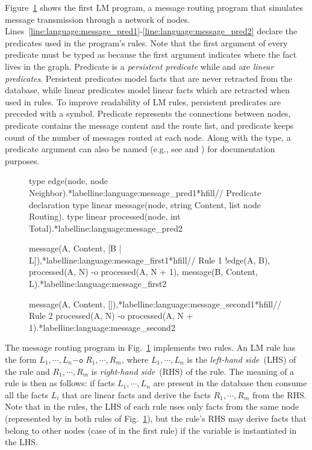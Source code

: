 
Figure~\ref{code:language:message} shows the first LM program, a message routing
program that simulates message transmission through a network of nodes.
Lines~\ref{line:language:message_pred1}-\ref{line:language:message_pred2}
declare the predicates used in the program's rules. Note that the first argument
of every predicate must be typed as  because the first argument
indicates where the fact lives in the graph. Predicate  is a
\emph{persistent predicate} while  and  are
\emph{linear predicates}. Persistent predicates model facts that are never
retracted from the database, while linear predicates model linear facts which
are retracted when used in rules. To improve readability of LM rules, persistent
predicates are preceded with a \code{!} symbol. Predicate  represents
the connections between nodes, predicate  contains the message
content and the route list, and predicate  keeps count of the
number of messages routed at each node. Along with the type, a predicate
argument can also be named (e.g., see  and ) for
documentation purposes.

\begin{figure}[h!]
\begin{LineCode}[commandchars=\*\{\}]
type edge(node, node Neighbor).*label{line:language:message_pred1}*hfill// Predicate declaration
type linear message(node, string Content, list node Routing).
type linear processed(node, int Total).*label{line:language:message_pred2}

message(A, Content, [B | L]),*label{line:language:message_first1}*hfill// Rule 1
!edge(A, B),
processed(A, N)
   -o processed(A, N + 1),
      message(B, Content, L).*label{line:language:message_first2}

message(A, Content, []),*label{line:language:message_second1}*hfill// Rule 2
processed(A, N)
   -o processed(A, N + 1).*label{line:language:message_second2}
\end{LineCode}
\label{code:language:message}
\end{figure}

The message routing program in Fig.~\ref{code:language:message} implements two
rules. An LM rule has the form $L_1, \cdots, L_n \mathtt{-o} \; R_1, \cdots,
R_m$, where $L_1, \cdots, L_n$ is the \emph{left-hand side}~(LHS) of the rule
and $R_1, \cdots, R_m$ is \emph{right-hand side}~(RHS) of the rule. The meaning
of a rule is then as follows: if facts $L_1, \cdots, L_n$ are present in the
database then consume all the facts $L_i$ that are linear facts and derive the
facts $R_1, \cdots, R_m$ from the RHS. Note that in the rules, the LHS of each
rule uses only facts from the same node (represented by  in both rules
of Fig.~\ref{code:language:message}), but the rule's RHS may derive facts that
belong to other nodes (case of  in the first rule) if the variable is
instantiated in the LHS.

